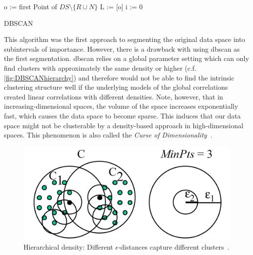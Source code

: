 \vspace{5mm}
\begin{algorithm}[H]
\SetAlgoLined
{}
 o := first Point of $DS\setminus \{R \cup N\}$\;
 L := [o]\;
 i := 0\;
 \caption{DBSCAN}
\end{algorithm}
\vspace{5mm}

This algorithm was the first approach to segmenting the original data space into subintervals of importance. However, there is a drawback with using \gls{dbscan} as the first segmentation. \gls{dbscan} relies on a global parameter setting which can only find clusters with approximately the same density or higher (c.f. \autoref{fig:DBSCANhierarchy}) and therefore would not be able to find the intrinsic clustering structure well if the underlying models of the global correlations created linear correlations with different densities. 
Note, however, that in increasing-dimensional spaces, the volume of the space increases exponentially fast, which causes the data space to become sparse. This induces that our data space might not be clusterable by a density-based approach in high-dimensional spaces. This phenomenon is also called the \textit{Curse of Dimensionality}~\cite{bellman2015adaptive}.

\begin{figure}
    \centering
    \includegraphics[width=.5\textwidth]{figures/DBSCANleastdensity.png}
    \caption{Hierarchical density: Different $\epsilon$-distances capture different clusters~\cite{opticsankerst1999optics}.}
    \label{fig:DBSCANhierarchy}
\end{figure}

